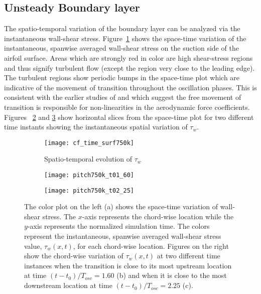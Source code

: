 \subsection{Unsteady Boundary layer}
The spatio-temporal variation of the boundary layer can be analyzed via the instantaneous wall-shear stress. Figure~\ref{fig:space-time_color750k} shows the space-time variation of the instantaneous, spanwise averaged wall-shear stress on the suction side of the airfoil surface. Areas which are strongly red in color are high shear-stress regions and thus signify turbulent flow (except the region very close to the leading edge). The turbulent regions show periodic bumps in the space-time plot which are indicative of the movement of transition throughout the oscillation phases. This is consistent with the earlier studies of \cite{mai11,hebler13} and \cite{lokattthesis} which suggest the free movement of transition is responsible for non-linearities in the aerodynamic force coefficients. Figures ~\ref{fig:750k_cf_x_t1.60} and \ref{fig:750k_cf_x_t2.25} show horizontal slices from the space-time plot for two different time instants showing the instantaneous spatial variation of $\tau_{w}$.  
\begin{figure}[h]
   	\centering
   	\begin{minipage}{0.55\linewidth}
   		\begin{subfigure}[t]{\linewidth}
   			\texttt{[image: cf\_time\_surf750k]}
   			\caption{Spatio-temporal evolution of $\tau_{w}$}
   			\label{fig:space-time_color750k}
   		\end{subfigure}
   	\end{minipage}   	
   	\begin{minipage}{0.44\linewidth}
   		\begin{subfigure}[t]{\linewidth}
   			\caption{}   			
   			\texttt{[image: pitch750k\_t01\_60]}
   			\label{fig:750k_cf_x_t1.60}
   		\end{subfigure}
   		\begin{subfigure}[t]{\textwidth}
   			\caption{}   			
   			\texttt{[image: pitch750k\_t02\_25]}
   			\label{fig:750k_cf_x_t2.25}
   		\end{subfigure}
   	\end{minipage}
   	\hfil
   	\caption{The color plot on the left (a) shows the space-time variation of wall-shear stress. The $x$-axis represents the chord-wise location while the $y$-axis represents the normalized simulation time. The colors represent the instantaneous, spanwise averaged wall-shear stress value, $\tau_{w}(x,t)$, for each chord-wise location. Figures on the right show the chord-wise variation of $\tau_{w}(x,t)$ at two different time instances when the transition is close to its most upstream location at time $(t-t_{0})/T_{osc}=1.60$ (b) and when it is close to the most downstream location at time $(t-t_{0})/T_{osc}=2.25$ (c).}
   	\label{fig:space-time_cf750k}
\end{figure}

